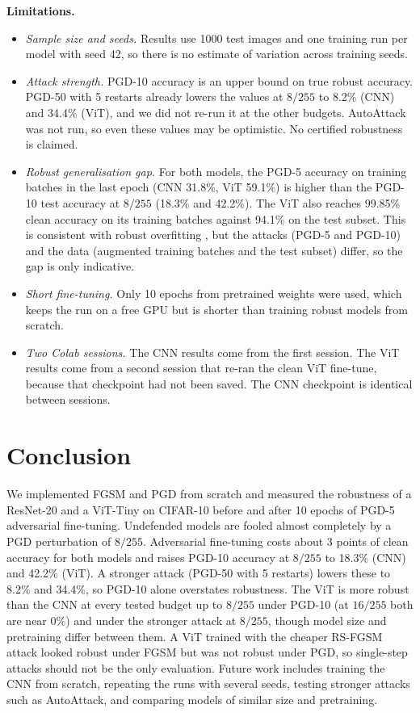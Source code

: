 \documentclass[twoside,a4paper,11pt]{article}
\begin{document}
\textbf{Limitations.}
\begin{itemize}
\item \emph{Sample size and seeds.} Results use 1000 test images and one
training run per model with seed 42, so there is no estimate of
variation across training seeds.
\item \emph{Attack strength.} PGD-10 accuracy is an upper bound on true
robust accuracy. PGD-50 with 5 restarts already lowers the values at
$8/255$ to 8.2\% (CNN) and 34.4\% (ViT), and we did not re-run it at the
other budgets. AutoAttack was not run, so even these values may be
optimistic. No certified robustness is claimed.
\item \emph{Robust generalisation gap.} For both models, the PGD-5
accuracy on training batches in the last epoch (CNN 31.8\%, ViT 59.1\%)
is higher than the PGD-10 test accuracy at $8/255$ (18.3\% and 42.2\%).
The ViT also reaches 99.85\% clean accuracy on its training batches
against 94.1\% on the test subset. This is consistent with robust
overfitting \cite{Rice:20}, but the attacks (PGD-5 and PGD-10) and the
data (augmented training batches and the test subset) differ, so the gap
is only indicative.
\item \emph{Short fine-tuning.} Only 10 epochs from pretrained weights
were used, which keeps the run on a free GPU but is shorter than
training robust models from scratch.
\item \emph{Two Colab sessions.} The CNN results come from the first
session. The ViT results come from a second session that re-ran the clean
ViT fine-tune, because that checkpoint had not been saved. The CNN
checkpoint is identical between sessions.
\end{itemize}

\section{Conclusion}

We implemented FGSM and PGD from scratch and measured the robustness of a
ResNet-20 and a ViT-Tiny on CIFAR-10 before and after 10 epochs of PGD-5
adversarial fine-tuning. Undefended models are fooled almost completely by
a PGD perturbation of $8/255$. Adversarial fine-tuning costs about 3
points of clean accuracy for both models and raises PGD-10 accuracy at
$8/255$ to 18.3\% (CNN) and 42.2\% (ViT). A stronger attack (PGD-50 with
5 restarts) lowers these to 8.2\% and 34.4\%, so PGD-10 alone overstates
robustness. The ViT is more robust than the CNN at every tested budget up
to $8/255$ under PGD-10 (at $16/255$ both are near 0\%) and under the
stronger attack at $8/255$, though model size and pretraining differ
between them. A ViT trained with the cheaper RS-FGSM attack looked robust
under FGSM but was not robust under PGD, so single-step attacks should not
be the only evaluation. Future work includes training the CNN from
scratch, repeating the runs with several seeds, testing stronger attacks
such as AutoAttack, and comparing models of similar size and pretraining.
\end{document}
